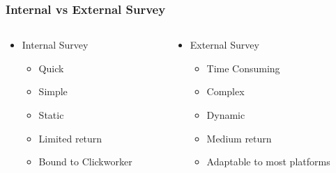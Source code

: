 \begin{frame}
	\frametitle{Internal vs External Survey}
	\begin{columns}
		\begin{column}{0.4\textwidth}
			\begin{itemize}
				\item Internal Survey
				\begin{itemize}
					\item Quick
					\item Simple
					\item Static
					\item Limited return
					\item Bound to Clickworker
				\end{itemize}
			\end{itemize}
		\end{column}
		\begin{column}{0.6\textwidth}
			\begin{itemize}
				\item External Survey
				\begin{itemize}
					\item Time Consuming
					\item Complex
					\item Dynamic
					\item Medium return
					\item Adaptable to most platforms
				\end{itemize}
			\end{itemize}
		\end{column}
	\end{columns}
\end{frame}